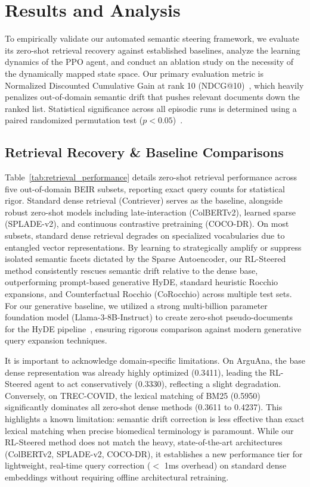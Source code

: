 \section{Results and Analysis}

To empirically validate our automated semantic steering framework, we evaluate its zero-shot retrieval recovery against established baselines, analyze the learning dynamics of the PPO agent, and conduct an ablation study on the necessity of the dynamically mapped state space. Our primary evaluation metric is Normalized Discounted Cumulative Gain at rank 10 (NDCG@10)~\citep{jarvelin2002}, which heavily penalizes out-of-domain semantic drift that pushes relevant documents down the ranked list. Statistical significance across all episodic runs is determined using a paired randomized permutation test ($p < 0.05$)~\citep{smucker2007}.

\subsection{Retrieval Recovery \& Baseline Comparisons}
Table~\ref{tab:retrieval_performance} details zero-shot retrieval performance across five out-of-domain BEIR subsets, reporting exact query counts for statistical rigor. Standard dense retrieval (Contriever) serves as the baseline, alongside robust zero-shot models including late-interaction (ColBERTv2), learned sparse (SPLADE-v2), and continuous contrastive pretraining (COCO-DR). On most subsets, standard dense retrieval degrades on specialized vocabularies due to entangled vector representations. By learning to strategically amplify or suppress isolated semantic facets dictated by the Sparse Autoencoder, our RL-Steered method consistently rescues semantic drift relative to the dense base, outperforming prompt-based generative HyDE, standard heuristic Rocchio expansions, and Counterfactual Rocchio (CoRocchio) across multiple test sets. For our generative baseline, we utilized a strong multi-billion parameter foundation model (Llama-3-8B-Instruct) to create zero-shot pseudo-documents for the HyDE pipeline~\citep{gao2022hyde}, ensuring rigorous comparison against modern generative query expansion techniques. 

It is important to acknowledge domain-specific limitations. On ArguAna, the base dense representation was already highly optimized (0.3411), leading the RL-Steered agent to act conservatively (0.3330), reflecting a slight degradation. Conversely, on TREC-COVID, the lexical matching of BM25 (0.5950) significantly dominates all zero-shot dense methods (0.3611 to 0.4237). This highlights a known limitation: semantic drift correction is less effective than exact lexical matching when precise biomedical terminology is paramount. While our RL-Steered method does not match the heavy, state-of-the-art architectures (ColBERTv2, SPLADE-v2, COCO-DR), it establishes a new performance tier for lightweight, real-time query correction ($<$ 1ms overhead) on standard dense embeddings without requiring offline architectural retraining.

